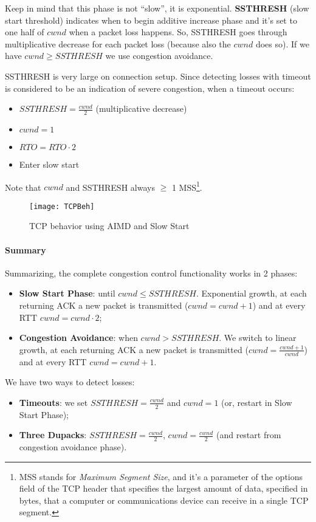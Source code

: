 Keep in mind that this phase is not ``slow'', it is exponential.
\textbf{SSTHRESH} (slow start threshold) indicates when to begin additive
increase phase and it's set to one half of $cwnd$ when a packet loss happens.
So, SSTHRESH goes through multiplicative decrease for each packet loss (because
also the $cwnd$ does so).
If we have $cwnd \ge SSTHRESH$ we use congestion avoidance.

SSTHRESH is very large on connection setup.
Since detecting losses with timeout is considered to be an indication 
of severe congestion, when a timeout occurs:	
\begin{itemize}
  \item $SSTHRESH = \frac{cwnd}{2}$ (multiplicative decrease)
  \item $cwnd=1$
  \item $RTO=RTO \cdot 2$
  \item Enter slow start
\end{itemize}

Note that $cwnd$ and SSTHRESH always $\ge$ 1 MSS\footnote{
MSS stands for \textit{Maximum Segment Size}, and it's a parameter of the
options field of the TCP header that specifies the largest amount of data,
specified in bytes, that a computer or communications device can receive in a
single TCP segment.
}. 

\begin{figure}[t]
  \centering
  \texttt{[image: TCPBeh]}
  \caption{TCP behavior using AIMD and Slow Start}			
  \label{fig:tcp:TCPBeh}
\end{figure}

\paragraph*{Summary}
Summarizing, the complete congestion control functionality works in 2 phases:
\begin{itemize}
  \item \textbf{Slow Start Phase}: until $cwnd \le SSTHRESH$.
Exponential growth, at each returning ACK a new packet is transmitted 
($cwnd=cwnd+1$) and at every RTT $cwnd=cwnd \cdot 2$; 
  \item \textbf{Congestion Avoidance}: when $cwnd > SSTHRESH$. We 
switch to linear growth, at each returning ACK a new packet is transmitted 
($cwnd=\frac{cwnd+1}{cwnd}$) and at every RTT $cwnd=cwnd+1$.
\end{itemize}
	
We have two ways to detect losses: 
\begin{itemize}
  \item \textbf{Timeouts}: we set $SSTHRESH=\frac{cwnd}{2}$ and $cwnd=1$
(or, restart in Slow Start Phase);
  \item \textbf{Three Dupacks}: $SSTHRESH=\frac{cwnd}{2}$, $cwnd=\frac{cwnd}{2}$
(and restart from congestion avoidance phase).		 
\end{itemize}
	
